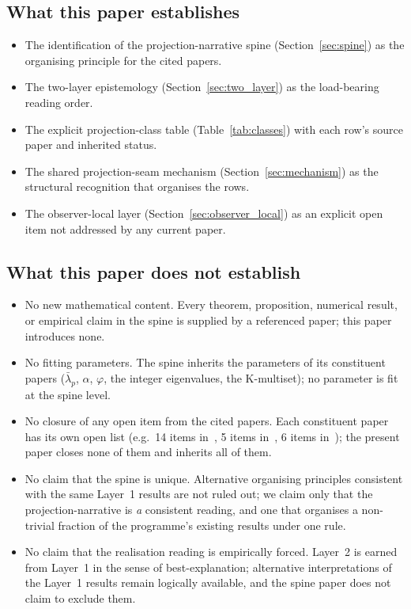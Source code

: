 \documentclass[12pt]{article}
\begin{document}
\subsection{What this paper establishes}

\begin{itemize}
    \item The identification of the projection-narrative spine (Section~\ref{sec:spine}) as the organising principle for the cited papers.
    \item The two-layer epistemology (Section~\ref{sec:two_layer}) as the load-bearing reading order.
    \item The explicit projection-class table (Table~\ref{tab:classes}) with each row's source paper and inherited status.
    \item The shared projection-seam mechanism (Section~\ref{sec:mechanism}) as the structural recognition that organises the rows.
    \item The observer-local layer (Section~\ref{sec:observer_local}) as an explicit open item not addressed by any current paper.
\end{itemize}

\subsection{What this paper does not establish}

\begin{itemize}
    \item No new mathematical content. Every theorem, proposition, numerical result, or empirical claim in the spine is supplied by a referenced paper; this paper introduces none.
    \item No fitting parameters. The spine inherits the parameters of its constituent papers ($\bar\lambda_p$, $\alpha$, $\varphi$, the integer eigenvalues, the K-multiset); no parameter is fit at the spine level.
    \item No closure of any open item from the cited papers. Each constituent paper has its own open list (e.g.\ 14 items in~\citep{SmartXXXII}, 5 items in~\citep{SmartTransportLaw}, 6 items in~\citep{SmartACT}); the present paper closes none of them and inherits all of them.
    \item No claim that the spine is unique. Alternative organising principles consistent with the same Layer~1 results are not ruled out; we claim only that the projection-narrative is \emph{a} consistent reading, and one that organises a non-trivial fraction of the programme's existing results under one rule.
    \item No claim that the realisation reading is empirically forced. Layer~2 is earned from Layer~1 in the sense of best-explanation; alternative interpretations of the Layer~1 results remain logically available, and the spine paper does not claim to exclude them.
\end{itemize}
\end{document}

